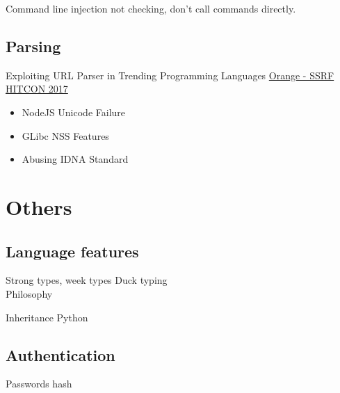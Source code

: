 \documentclass{beamer}
\begin{document}
\begin{CJK*}{UTF8}{bsmi}
    \begin{frame}{Command line injection}
        not checking, don't call commands directly.
    \end{frame}

    \subsection{Parsing}
    \begin{frame}{Exploiting URL Parser in Trending Programming Languages}
        \href{https://hitcon.org/2017/CMT/slide-files/d2_r0_keynote.pdf}{Orange - SSRF HITCON 2017}
        \begin{itemize}
            \item NodeJS Unicode Failure
            \item GLibc NSS Features
            \item Abusing IDNA Standard
        \end{itemize}
    \end{frame}

    \section{Others}
    \subsection{Language features}
    \begin{frame}{Strong types, week types}
        Duck typing\\
        Philosophy
    \end{frame}

    \begin{frame}{Inheritance}
        Python
    \end{frame}

    \subsection{Authentication}
    \begin{frame}{Passwords}
        hash
    \end{frame}


\end{CJK*}
\end{document}
